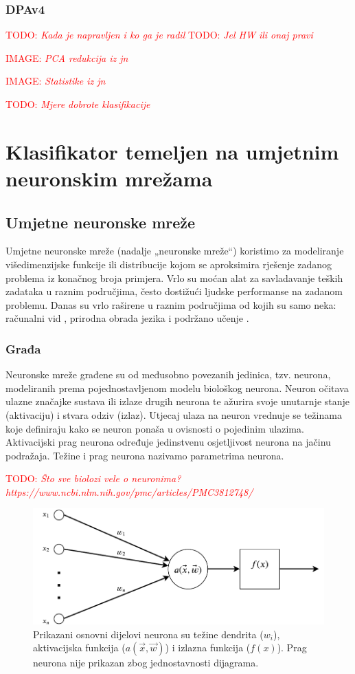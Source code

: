 \documentclass[times, utf8, diplomski]{fer}
\def\TODO#1{\noindent\textcolor{red}{TODO: \textit{#1}}\newline}
\def\todo#1{\TODO{#1}}
\def\todoimg#1{\begin{center} \textcolor{red}{IMAGE: \textit{#1}} \end{center}}
\begin{document}
\subsection{DPAv4}
\todo{Kada je napravljen i ko ga je radil}
\todo{Jel HW ili onaj pravi}
\todoimg{PCA redukcija iz jn}
\todoimg{Statistike iz jn}
\todo{Mjere dobrote klasifikacije}

\chapter{Klasifikator temeljen na umjetnim neuronskim mrežama}

\section{Umjetne neuronske mreže}
Umjetne neuronske mreže (nadalje „neuronske mreže“) koristimo za modeliranje višedimenzijske funkcije ili distribucije kojom se aproksimira rješenje zadanog problema iz konačnog broja primjera. Vrlo su moćan alat za savladavanje teških zadataka u raznim područjima, često dostižući ljudske performanse na zadanom problemu. Danas su vrlo raširene u raznim područjima od kojih su samo neka: računalni vid \citep{alexnet,yolo}, prirodna obrada jezika \citep{word2vec,char_cnn} i podržano učenje \citep{atari,active_learn}.

\subsection{Građa}
Neuronske mreže građene su od međusobno povezanih jedinica, tzv. neurona, modeliranih prema pojednostavljenom modelu biološkog neurona. Neuron očitava ulazne značajke sustava ili izlaze drugih neurona te ažurira svoje unutarnje stanje (aktivaciju) i stvara odziv (izlaz). Utjecaj ulaza na neuron vrednuje se težinama  koje definiraju kako se neuron ponaša u ovisnosti o pojedinim ulazima. Aktivacijski prag neurona  određuje jedinstvenu osjetljivost neurona na jačinu podražaja. Težine i prag neurona nazivamo parametrima neurona.

\todo{Što sve biolozi vele o neuronima? https://www.ncbi.nlm.nih.gov/pmc/articles/PMC3812748/}

\begin{figure}[h]
\centering
\includegraphics[scale=0.7]{Neuron.pdf}
\caption{Prikazani osnovni dijelovi neurona su težine dendrita ($w_i$), aktivacijska funkcija ($a(\vec{x},\vec{w})$) i izlazna funkcija ($f(x)$). Prag neurona nije prikazan zbog jednostavnosti dijagrama.}
\label{fig:neuron}
\end{figure}
\end{document}

